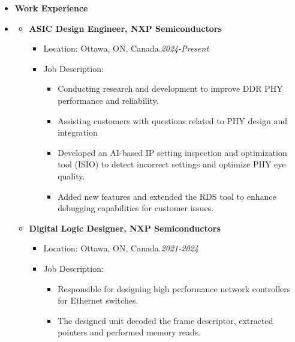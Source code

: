 \begin {itemize} \item [] {\bf \Large   Work Experience }  \vspace{-1.5em}
\item []  {\bf \hrulefill } \mdseries \normalsize 
    \begin {itemize}
    \item [$\bullet$] \bf {\mtf \normalsize  ASIC Design Engineer, NXP Semiconductors} \mdseries
            \begin {itemize}
                \item [-]  {  Location:  Ottawa, ON,  Canada.\small \hspace{5.8cm}\textit{2024-Present}\normalsize} 
                \item [-]   {   Job Description:} 
                    \begin {itemize}   
                        \item [\textbullet] Conducting research and development to improve DDR PHY performance and reliability.
                        \item [\textbullet] Assisting customers with questions related to PHY design and integration
                        \item [\textbullet] Developed an AI-based IP setting inspection and optimization tool (ISIO) to detect incorrect settings and optimize PHY eye quality.
                        \item [\textbullet] Added new features and extended the RDS tool to enhance debugging capabilities for customer issues.
                    \end {itemize}
            \end {itemize} \vspace{0.3cm}
        \item [$\bullet$] \bf {\mtf \normalsize  Digital Logic Designer, NXP Semiconductors} \mdseries
            \begin {itemize}
                \item [-]  {  Location:  Ottawa, ON,  Canada.\small \hspace{5.8cm}\textit{2021-2024}\normalsize} 
                \item [-]   {   Job Description:} 
                    \begin {itemize}   
                        \item [\textbullet] Responsible for designing high performance network controllers for Ethernet switches.
                        \item [\textbullet] The designed unit decoded the frame descriptor, extracted pointers and performed memory reads.

\end{itemize}
\end{itemize}
\end{itemize}
\end{itemize}
